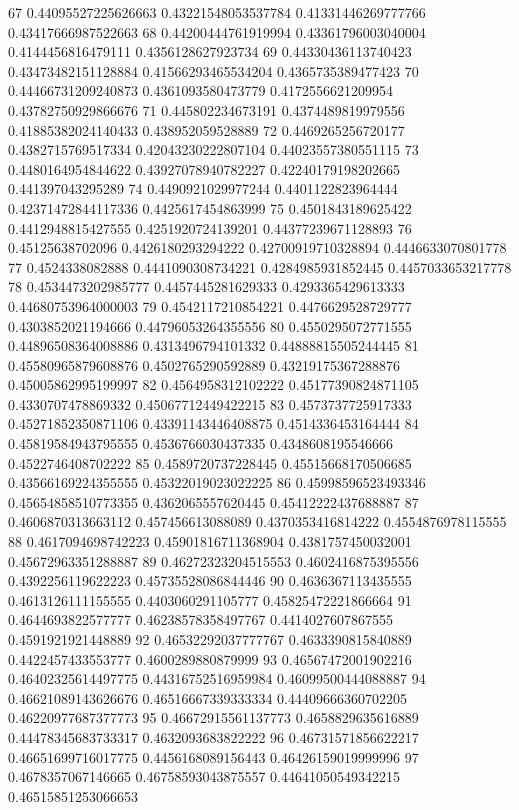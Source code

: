 67 0.44095527225626663 0.43221548053537784 0.41331446269777766 0.43417666987522663
68 0.44200444761919994 0.43361796003040004 0.4144456816479111 0.4356128627923734
69 0.44330436113740423 0.43473482151128884 0.41566293465534204 0.4365735389477423
70 0.44466731209240873 0.4361093580473779 0.4172556621209954 0.43782750929866676
71 0.445802234673191 0.4374489819979556 0.41885382024140433 0.438952059528889
72 0.4469265256720177 0.4382715769517334 0.42043230222807104 0.44023557380551115
73 0.4480164954844622 0.43927078940782227 0.42240179198202665 0.441397043295289
74 0.4490921029977244 0.4401122823964444 0.42371472844117336 0.4425617454863999
75 0.4501843189625422 0.4412948815427555 0.4251920724139201 0.44377239671128893
76 0.45125638702096 0.4426180293294222 0.42700919710328894 0.4446633070801778
77 0.4524338082888 0.4441090308734221 0.4284985931852445 0.4457033653217778
78 0.4534473202985777 0.4457445281629333 0.4293365429613333 0.44680753964000003
79 0.4542117210854221 0.4476629528729777 0.4303852021194666 0.44796053264355556
80 0.4550295072771555 0.44896508364008886 0.4313496794101332 0.44888815505244445
81 0.45580965879608876 0.4502765290592889 0.43219175367288876 0.45005862995199997
82 0.4564958312102222 0.45177390824871105 0.4330707478869332 0.45067712449422215
83 0.4573737725917333 0.45271852350871106 0.43391143446408875 0.4514336453164444
84 0.45819584943795555 0.4536766030437335 0.4348608195546666 0.4522746408702222
85 0.4589720737228445 0.45515668170506685 0.43566169224355555 0.45322019023022225
86 0.45998596523493346 0.45654858510773355 0.4362065557620445 0.45412222437688887
87 0.4606870313663112 0.457456613088089 0.4370353416814222 0.4554876978115555
88 0.4617094698742223 0.45901816711368904 0.4381757450032001 0.45672963351288887
89 0.46272323204515553 0.4602416875395556 0.4392256119622223 0.45735528086844446
90 0.4636367113435555 0.4613126111155555 0.4403060291105777 0.45825472221866664
91 0.4644693822577777 0.46238578358497767 0.4414027607867555 0.4591921921448889
92 0.46532292037777767 0.4633390815840889 0.4422457433553777 0.4600289880879999
93 0.46567472001902216 0.46402325614497775 0.44316752516959984 0.46099500444088887
94 0.46621089143626676 0.46516667339333334 0.44409666360702205 0.46220977687377773
95 0.46672915561137773 0.4658829635616889 0.44478345683733317 0.4632093683822222
96 0.46731571856622217 0.46651699716017775 0.4456168089156443 0.46426159019999996
97 0.4678357067146665 0.46758593043875557 0.44641050549342215 0.46515851253066653
